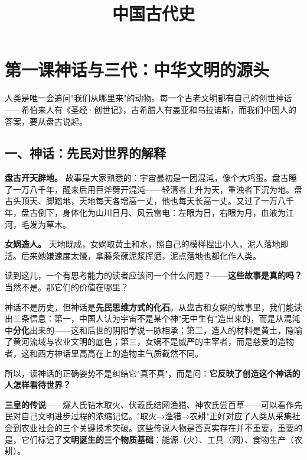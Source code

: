 \documentclass[a4paper,12pt]{ctexart}
\title{\textcolor{blue!70!black}{\Huge\textbf{中国古代史}}}
\author{}
\date{}
\begin{document}
\maketitle
\thispagestyle{empty}

\tableofcontents
\newpage

\section{\textcolor{orange!80!black}{第一课\quad 神话与三代：中华文明的源头}}

人类是唯一会追问"我们从哪里来"的动物。每一个古老文明都有自己的创世神话——希伯来人有《圣经·创世记》，古希腊人有盖亚和乌拉诺斯，而我们中国人的答案，要从盘古说起。

\subsection*{一、神话：先民对世界的解释}

\textbf{盘古开天辟地。} 故事是大家熟悉的：宇宙最初是一团混沌，像个大鸡蛋。盘古睡了一万八千年，醒来后用巨斧劈开混沌——轻清者上升为天，重浊者下沉为地。盘古头顶天、脚踏地，天地每天各增高一丈，他也每天长高一丈。又过了一万八千年，盘古倒下，身体化为山川日月、风云雷电：左眼为日，右眼为月，血液为江河，毛发为草木。

\textbf{女娲造人。} 天地既成，女娲取黄土和水，照自己的模样捏出小人，泥人落地即活。后来她嫌速度太慢，拿藤条蘸泥浆挥洒，泥点落地也都化作人类。

读到这儿，一个有思考能力的读者应该问一个什么问题？——\textbf{这些故事是真的吗？} 当然不是。那它们的价值在哪里？

神话不是历史，但神话是\textbf{先民思维方式的化石}。从盘古和女娲的故事里，我们能读出三条信息：第一，中国人认为宇宙不是某个神"无中生有"造出来的，而是从混沌中\textbf{分化}出来的——这和后世的阴阳学说一脉相承；第二，造人的材料是黄土，隐喻了黄河流域与农业文明的底色；第三，女娲不是威严的主宰者，而是慈爱的造物者，这和西方神话里高高在上的造物主气质截然不同。

所以，读神话的正确姿势不是纠结它"真不真"，而是问：\textbf{它反映了创造这个神话的人怎样看待世界？}

\textbf{三皇的传说}——燧人氏钻木取火、伏羲氏结网渔猎、神农氏尝百草——可以看作先民对自己文明进步过程的浓缩记忆。"取火→渔猎→农耕"正好对应了人类从采集社会到农业社会的三个关键技术突破。这些传说人物是否真实存在并不重要，重要的是，它们标记了\textbf{文明诞生的三个物质基础}：能源（火）、工具（网）、食物生产（农耕）。

\begin{center}
\end{center}
\end{document}
